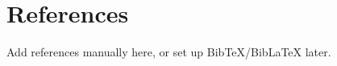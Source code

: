 \documentclass[12pt,a4paper]{article}
\begin{document}



\section*{References}

Add references manually here, or set up BibTeX/BibLaTeX later.
\end{document}
